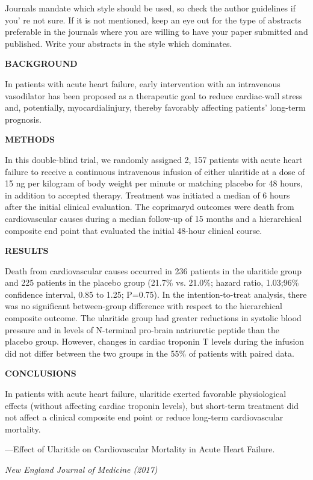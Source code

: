 \documentclass[a4paper]{ctexbook}
\begin{document}
Journals mandate which style should be used, so check the author guidelines if you' re not sure. If it is not mentioned, keep an eye out for the type of abstracts preferable in the journals where you are willing to have your paper submitted and published. Write your abstracts in the style which dominates.



\begin{sample}[label={myautocounter}]{\heiti}
  \textbf{BACKGROUND} 
  
  In patients with acute heart failure, early intervention with an intravenous vasodilator has been proposed as a therapeutic goal to reduce cardiac-wall stress and, potentially, myocardialinjury, thereby favorably affecting patients' long-term prognosis.

  \textbf{METHODS} 
  
  In this double-blind trial, we randomly assigned 2, 157 patients with acute heart failure to receive a continuous intravenous infusion of either ularitide at a dose of 15 ng per kilogram of body weight per minute or matching placebo for 48 hours, in addition to accepted therapy.
  Treatment was initiated a median of 6 hours after the initial clinical evaluation. The coprimaryd outcomes were death from cardiovascular causes during a median follow-up of 15 months and a hierarchical composite end point that evaluated the initial 48-hour clinical course.
  
  \textbf{RESULTS} 
  
  Death from cardiovascular causes occurred in 236 patients in the ularitide group and 225 patients in the placebo group (21.7\% vs. 21.0\%; hazard ratio, 1.03;96\% confidence interval, 0.85 to 1.25; P=0.75). In the intention-to-treat analysis, there was no significant between-group difference with respect to the hierarchical composite outcome. The ularitide group had greater reductions in systolic blood pressure and in levels of N-terminal pro-brain natriuretic peptide than the placebo group. However, changes in cardiac troponin T levels during the infusion did not differ between the two groups in the 55\% of patients with paired data.

  \textbf{CONCLUSIONS} 
  
  In patients with acute heart failure, ularitide exerted favorable physiological effects (without affecting cardiac troponin levels), but short-term treatment did not affect a clinical composite end point or reduce long-term cardiovascular mortality.

  \begin{flushright}
    ---Effect of Ularitide on Cardiovascular Mortality in Acute Heart Failure.

    \emph{New England Journal of Medicine (2017)}
  \end{flushright}

  
\end{sample}
\end{document}
